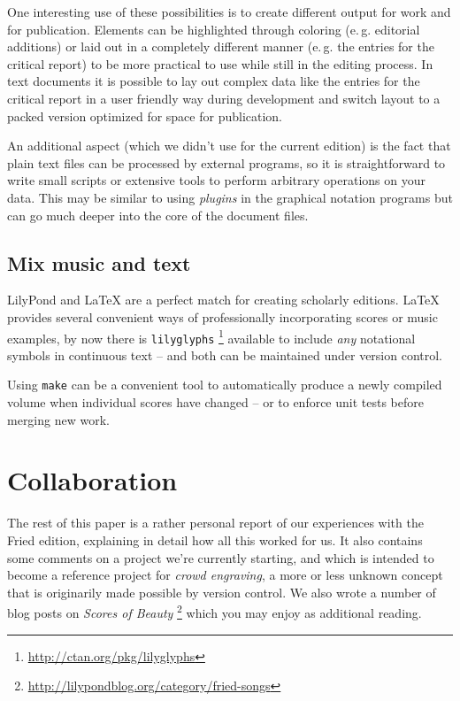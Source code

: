 \documentclass[11pt,a4paper]{article}
\begin{document}
One interesting use of these possibilities is to create different output for work and for
publication. Elements can be highlighted through coloring (e.\,g. editorial additions)
or laid out in a completely different manner (e.\,g. the entries for the critical report) to 
be more practical to use while still in the editing process. In text documents it is
possible to lay out complex data like the entries for the critical report in a
user friendly way during development and switch layout to a packed version optimized
for space for publication.

An additional aspect (which we didn't use for the current edition) is the fact that
plain text files can be processed by external programs, so it is straightforward to
write small scripts or extensive tools to perform arbitrary operations on your data.
This may be similar to using \emph{plugins} in the graphical notation programs but
can go much deeper into the core of the document files.

\subsection{Mix music and text}
LilyPond and \LaTeX{} are a perfect match for creating scholarly editions. \LaTeX{}
provides several convenient ways of professionally incorporating scores or music examples,
by now there is \texttt{lilyglyphs}%
\footnote{\url{http://ctan.org/pkg/lilyglyphs}}
available to include \emph{any} notational symbols in continuous text -- and both
can be maintained under version control.

Using \texttt{make} can be a convenient tool to automatically produce a newly compiled
volume when individual scores have changed -- or to enforce unit tests before merging
new work.


\section{Collaboration}\label{sec:collaboration}
The rest of this paper is a rather personal report of our experiences with the Fried
edition, explaining in detail how all this worked for us.  It also contains
some comments on a project we're currently starting, and which is intended to become
a reference project for \emph{crowd engraving}, a more or less unknown concept that is
originarily made possible by version control. We also wrote a number of blog posts on
\emph{Scores of Beauty}%
\footnote{\url{http://lilypondblog.org/category/fried-songs}}
which you may enjoy as additional reading.
\end{document}
